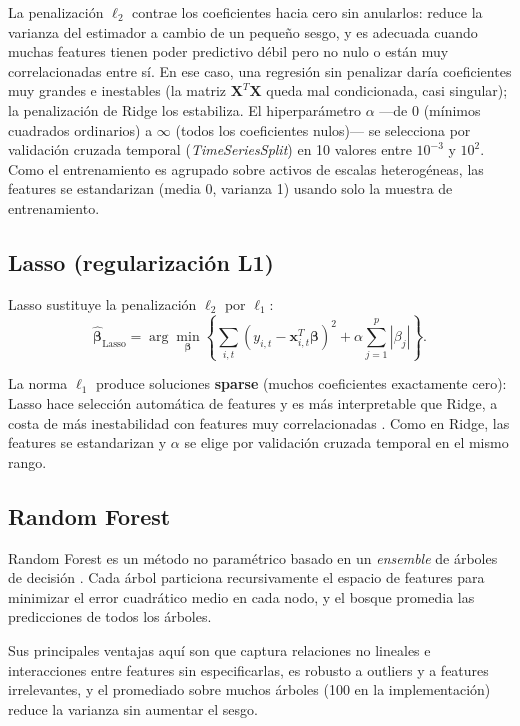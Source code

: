 La penalización $\ell_2$ contrae los coeficientes hacia cero sin anularlos:
reduce la varianza del estimador a cambio de un pequeño sesgo, y es adecuada
cuando muchas features tienen poder predictivo débil pero no nulo o están muy
correlacionadas entre sí. En ese caso, una regresión sin penalizar daría
coeficientes muy grandes e inestables (la matriz $\mathbf{X}^T\mathbf{X}$ queda
mal condicionada, casi singular); la penalización de Ridge los estabiliza. El
hiperparámetro $\alpha$ ---de $0$ (mínimos cuadrados ordinarios) a $\infty$
(todos los coeficientes nulos)--- se selecciona por validación cruzada temporal
(\textit{TimeSeriesSplit}) en 10 valores entre $10^{-3}$ y $10^{2}$. Como el
entrenamiento es agrupado sobre activos de escalas heterogéneas, las features se
estandarizan (media 0, varianza 1) usando solo la muestra de entrenamiento.

\subsection{Lasso (regularización L1)}

Lasso \cite{Tibshirani1996} sustituye la penalización $\ell_2$ por $\ell_1$:
\begin{equation}
    \hat{\boldsymbol{\beta}}_{\text{Lasso}} =
    \arg\min_{\boldsymbol{\beta}} \left\{
    \sum_{i,t} (y_{i,t} - \mathbf{x}_{i,t}^T \boldsymbol{\beta})^2
    + \alpha \sum_{j=1}^{p} |\beta_j|
    \right\}.
    \label{eq:lasso}
\end{equation}

La norma $\ell_1$ produce soluciones \textbf{sparse} (muchos coeficientes
exactamente cero): Lasso hace selección automática de features y es más
interpretable que Ridge, a costa de más inestabilidad con features muy
correlacionadas \cite{Zou2005}. Como en Ridge, las features se estandarizan y
$\alpha$ se elige por validación cruzada temporal en el mismo rango.

\subsection{Random Forest}

Random Forest es un método no paramétrico basado en un \textit{ensemble} de
árboles de decisión \cite{Breiman2001}. Cada árbol particiona recursivamente
el espacio de features para minimizar el error cuadrático medio en cada nodo,
y el bosque promedia las predicciones de todos los árboles.

Sus principales ventajas aquí son que captura relaciones no lineales e
interacciones entre features sin especificarlas, es robusto a outliers y a
features irrelevantes, y el promediado sobre muchos árboles (100 en la
implementación) reduce la varianza sin aumentar el sesgo.

